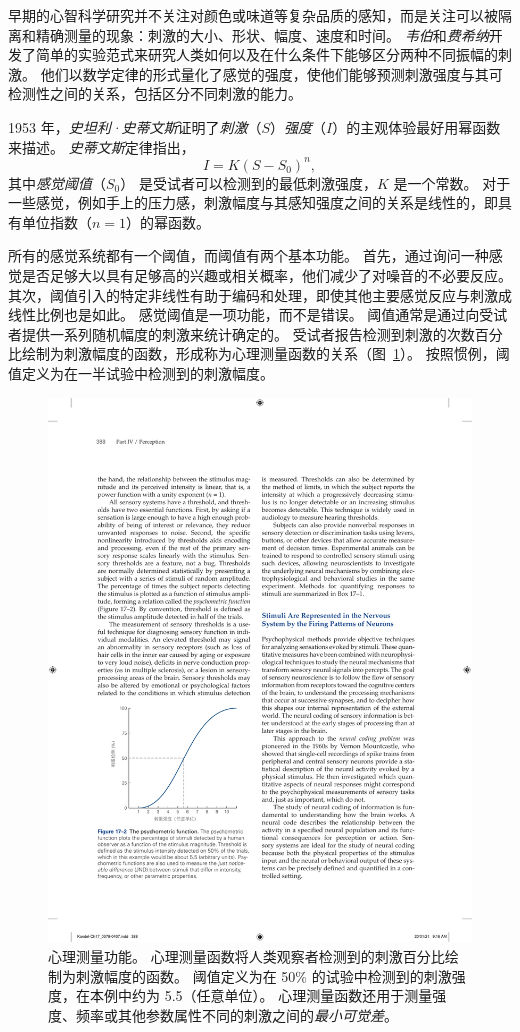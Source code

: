 早期的心智科学研究并不关注对颜色或味道等复杂品质的感知，而是关注可以被隔离和精确测量的现象：刺激的大小、形状、幅度、速度和时间。 
\textit{韦伯}和\textit{费希纳}开发了简单的实验范式来研究人类如何以及在什么条件下能够区分两种不同振幅的刺激。 
他们以数学定律的形式量化了感觉的强度，使他们能够预测刺激强度与其可检测性之间的关系，包括区分不同刺激的能力。


1953 年，\textit{史坦利·史蒂文斯}证明了\textit{刺激}（$ S $）\textit{强度}（$ I $）的主观体验最好用幂函数来描述。 
\textit{史蒂文斯}定律指出，
\begin{equation}
	I = K(S-S_0)^n,
\end{equation}
其中\textit{感觉阈值}（$ S_0 $） 是受试者可以检测到的最低刺激强度，$K$ 是一个常数。 
对于一些感觉，例如手上的压力感，刺激幅度与其感知强度之间的关系是线性的，即具有单位指数（$ n = 1 $）的幂函数。


所有的感觉系统都有一个阈值，而阈值有两个基本功能。 
首先，通过询问一种感觉是否足够大以具有足够高的兴趣或相关概率，他们减少了对噪音的不必要反应。
其次，阈值引入的特定非线性有助于编码和处理，即使其他主要感觉反应与刺激成线性比例也是如此。
感觉阈值是一项功能，而不是错误。 
阈值通常是通过向受试者提供一系列随机幅度的刺激来统计确定的。
受试者报告检测到刺激的次数百分比绘制为刺激幅度的函数，形成称为心理测量函数的关系（图~\ref{fig:17_2}）。 
按照惯例，阈值定义为在一半试验中检测到的刺激幅度。


\begin{figure}[htbp]
	\centering
	\includegraphics[width=0.55\linewidth]{chap17/fig_17_2}
	\caption{心理测量功能。 
		心理测量函数将人类观察者检测到的刺激百分比绘制为刺激幅度的函数。 
		阈值定义为在 50\% 的试验中检测到的刺激强度，在本例中约为 5.5（任意单位）。 
		心理测量函数还用于测量强度、频率或其他参数属性不同的刺激之间的\textit{最小可觉差}。}
	\label{fig:17_2}
\end{figure}


